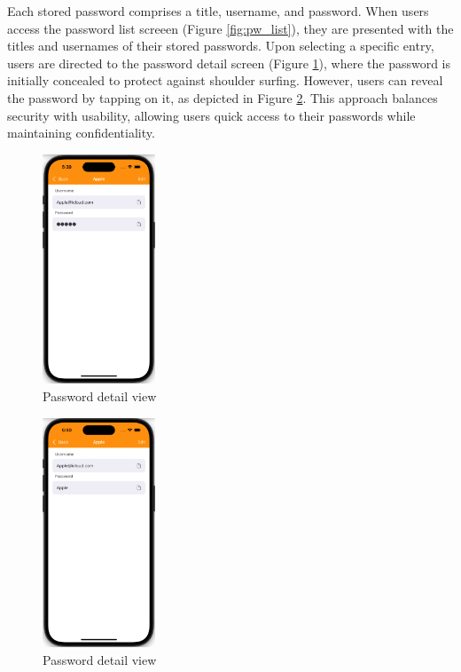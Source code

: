 \documentclass[10pt, titlepage]{article}
\begin{document}
Each stored password comprises a title, username, and password. When users access the password list screeen (Figure \ref{fig:pw_list}), they are presented with the titles and usernames of their stored passwords. Upon selecting a specific entry, users are directed to the password detail screen (Figure \ref{fig:pw_detail_0}), where the password is initially concealed to protect against shoulder surfing. However, users can reveal the password by tapping on it, as depicted in Figure \ref{fig:pw_detail_1}. This approach balances security with usability, allowing users quick access to their passwords while maintaining confidentiality.
\begin{figure}[H]
	\centering
	\vspace{-0.25em}
	\includegraphics[width=0.3\textwidth]{img/pw_detail_0}
	\vspace{-0.75em}
	\caption{Password detail view}
	\label{fig:pw_detail_0}
	\vspace{-0.75em}
\end{figure}

\begin{figure}[H]
	\centering
	\vspace{-0.25em}
	\includegraphics[width=0.3\textwidth]{img/pw_detail_1}
	\vspace{-0.75em}
	\caption{Password detail view}
	\label{fig:pw_detail_1}
	\vspace{-0.75em}
\end{figure}
\end{document}
